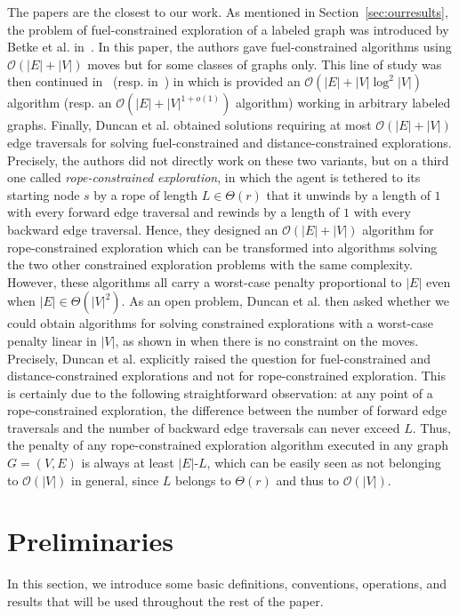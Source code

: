 \documentclass[11pt]{article}
\begin{document}
The papers
\cite{AwerbuchBRS99,AwerbuchK98,BetkeRS95,DuncanKK06} are the closest
to our work. As mentioned in Section~\ref{sec:ourresults}, the problem
of fuel-constrained exploration of a labeled graph was introduced by
Betke et al. in~\cite{BetkeRS95}. In this paper, the authors gave
fuel-constrained algorithms using $\mathcal{O}(|E|+|V|)$ moves but for
some classes of graphs only. This line of study was then continued
in~\cite{AwerbuchBRS99} (resp. in~\cite{AwerbuchK98}) in which is
provided an $\mathcal{O}(|E|+|V|{\log^2|V|})$ algorithm (resp. an
$\mathcal{O}(|E|+|V|^{1+o(1)})$ algorithm) working in arbitrary
labeled graphs. Finally, Duncan et al. \cite{DuncanKK06} obtained
solutions requiring at most $\mathcal{O}(|E|+|V|)$ edge traversals for
solving fuel-constrained and distance-constrained
explorations. Precisely, the authors did not directly work on these
two variants, but on a third one called \emph{rope-constrained
exploration}, in which the agent is tethered to its starting node $s$
by a rope of length $L\in\Theta(r)$ that it unwinds by a length of $1$
with every forward edge traversal and rewinds by a length of $1$ with
every backward edge traversal. Hence, they designed an
$\mathcal{O}(|E|+|V|)$ algorithm for rope-constrained exploration
which can be transformed into algorithms solving the two other
constrained exploration problems with the same complexity. However,
these algorithms all carry a worst-case penalty proportional to
$|E|$ even when $|E|\in\Theta(|V|^2)$. As an open problem, Duncan et al. then asked whether we could
obtain algorithms for solving constrained explorations with a
worst-case penalty linear in $|V|$, as shown in \cite{PanaiteP99} when
there is no constraint on the moves. Precisely, Duncan et
al. explicitly raised the question for fuel-constrained and
distance-constrained explorations and not for rope-constrained
exploration. This is certainly due to the following straightforward
observation: at any point of a rope-constrained exploration, the
difference between the number of forward edge traversals and the
number of backward edge traversals can never exceed $L$. Thus, the
penalty of any rope-constrained exploration algorithm executed in any
graph $G=(V,E)$ is always at least $|E|$-$L$, which can be easily seen
as not belonging to $\mathcal{O}(|V|)$ in general, since $L$ belongs
to $\Theta(r)$ and thus to $\mathcal{O}(|V|)$.



\section{Preliminaries}
\label{sec:preli}
In this section, we introduce some basic definitions, conventions, operations, and results that will be used throughout the rest of the paper.
\end{document}

